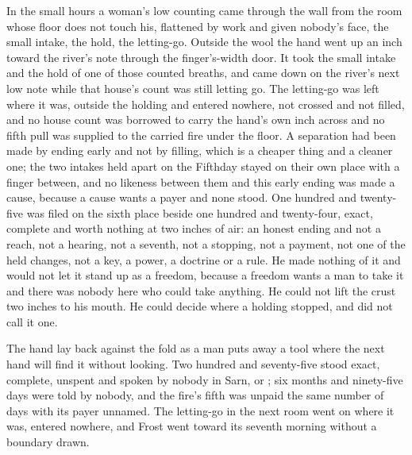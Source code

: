 In the small hours a woman's low counting came through the wall from the room whose floor does not touch his, flattened by work and given nobody's face, the small intake, the hold, the letting-go. Outside the wool the hand went up an inch toward the river's note through the finger's-width door. It took the small intake and the hold of one of those counted breaths, and came down on the river's next low note while that house's count was still letting go. The letting-go was left where it was, outside the holding and entered nowhere, not crossed and not filled, and no house count was borrowed to carry the hand's own inch across and no fifth pull was supplied to the carried fire under the floor. A separation had been made by ending early and not by filling, which is a cheaper thing and a cleaner one; the two intakes held apart on the Fifthday stayed on their own place with a finger between, and no likeness between them and this early ending was made a cause, because a cause wants a payer and none stood. One hundred and twenty-five was filed on the sixth place beside one hundred and twenty-four, exact, complete and worth nothing at two inches of air: an honest ending and not a reach, not a hearing, not a seventh, not a stopping, not a payment, not one of the held changes, not a key, a power, a doctrine or a rule. He made nothing of it and would not let it stand up as a freedom, because a freedom wants a man to take it and there was nobody here who could take anything. He could not lift the crust two inches to his mouth. He could decide where a holding stopped, and did not call it one.

The hand lay back against the fold as a man puts away a tool where the next hand will find it without looking. Two hundred and seventy-five stood exact, complete, unspent and spoken by nobody in Sarn,  or ; six months and ninety-five days were told by nobody, and the fire's fifth was unpaid the same number of days with its payer unnamed. The letting-go in the next room went on where it was, entered nowhere, and Frost went toward its seventh morning without a boundary drawn.
